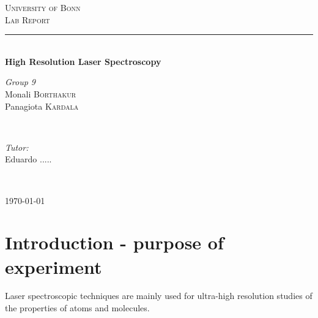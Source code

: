 \documentclass[openany,11pt,a4paper]{book}
\begin{document}
\pagestyle{empty}


\begin{titlepage}

\newcommand{\HRule}{\rule{\linewidth}{0.5mm}} 
\center 

\textsc{\LARGE University of Bonn}\\[1.5cm]
\textsc{\Large  Lab Report}\\[0.5cm] 

\vfill


\HRule \\[0.4cm]
{\huge \textbf {High Resolution Laser Spectroscopy}}

 
\vfill

\begin{minipage}{0.4\textwidth}
\begin{flushleft} \large
\emph{Group 9}\\
Monali \textsc{Borthakur}\\
Panagiota \textsc{Kardala} 
\end{flushleft}
\end{minipage}
~
\begin{minipage}{0.4\textwidth}
\begin{flushright} \large
\emph{Tutor:} \\
Eduardo \textsc{.....} 
\end{flushright}
\end{minipage}\\[4cm]


\vfill


{\large \today}\\[3cm] 

 

\vfill

\end{titlepage}


\pagestyle{plain}

\tableofcontents







\chapter{Introduction - purpose of experiment}

Laser spectroscopic techniques are mainly used for ultra-high resolution studies of the
properties of atoms and molecules.\\
 
\end{document}
